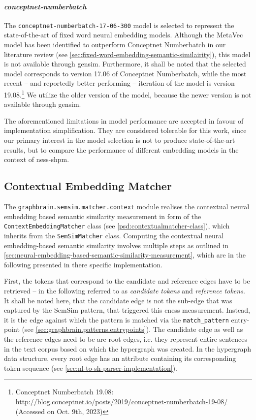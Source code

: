 \documentclass[11pt]{scrreprt}
\begin{document}
{\paragraph{\textit{conceptnet-numberbatch}} The \texttt{conceptnet-numberbatch-17-06-300} model is selected to represent the state-of-the-art of fixed word neural embedding models. Although the MetaVec model has been identified to outperform Conceptnet Numberbatch in our literature review (see \cref{sec:fixed-word-embedding-semantic-similairity}), this model is not available through gensim. Furthermore, it shall be noted that the selected model corresponds to version 17.06 of Conceptnet Numberbatch, while the most recent -- and reportedly better performing -- iteration of the model is version 19.08.\footnote{Conceptnet Numberbatch 19.08:\\\url{http://blog.conceptnet.io/posts/2019/conceptnet-numberbatch-19-08/}\\(Accessed on Oct. 9th, 2023)} We utilize the older version of the model, because the newer version is not available through gensim. 

\vspace{\baselineskip}
The aforementioned limitations in model performance are accepted in favour of implementation simplification. They are considered tolerable for this work, since our primary interest in the model selection is not to produce state-of-the-art results, but to compare the performance of different embedding models in the context of \gls{ness-shpm}.


\subsection{Contextual Embedding Matcher}
\label{sec:contextual-embedding-matchter}
The \texttt{graphbrain.semsim.matcher.context} module realises the contextual neural embedding based semantic similarity measurement in form of the \texttt{ContextEmbeddingMatcher} class (see \cref{psd:contextualmatcher-class}), which inherits from the \texttt{SemSimMatcher} class. Computing the contextual neural embedding-based semantic similarity involves multiple steps as outlined in \cref{sec:neural-embedding-based-semantic-similarity-measurement}, which are in the following presented in there specific implementation.

First, the tokens that correspond to the candidate and reference edges have to be retrieved -- in the following referred to as \textit{candidate tokens} and \textit{reference tokens}. It shall be noted here, that the candidate edge is not the sub-edge that was captured by the SemSim pattern, that triggered this \gls{cness} measurement. Instead, it is the edge against which the pattern is matched via the \texttt{match\_pattern} entry-point (see \cref{sec:graphbrain.patterns.entrypoints}). The candidate edge as well as the reference edges need to be are root edges, i.e. they represent entire sentences in the text corpus based on which the hypergraph was created.
In the hypergraph data structure, every root edge has an attribute containing its corresponding token sequence (see \cref{sec:nl-to-sh-parser-implementation}).

}
\end{document}
